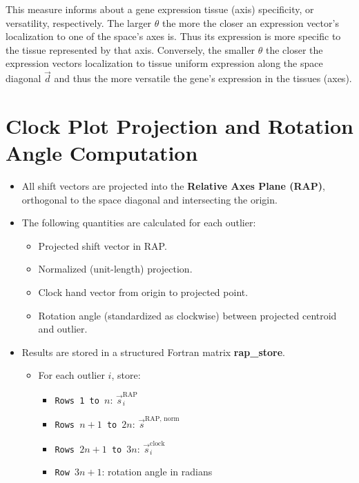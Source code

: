 \documentclass{article}
\begin{document}
This measure informs about a gene expression tissue (axis) specificity, or
versatility, respectively. The larger $\theta$ the more the closer an
expression vector's localization to one of the space's axes is. Thus its
expression is more specific to the tissue represented by that axis. Conversely,
the smaller $\theta$ the closer the expression vectors localization to tissue
uniform expression along the space diagonal $\vec{d}$ and thus the more
versatile the gene's expression in the tissues (axes).

\section{Clock Plot Projection and Rotation Angle Computation}
\label{sec:rap}
\begin{itemize}
    \item All shift vectors are projected into the \textbf{Relative Axes Plane
      (RAP)}, orthogonal to the space diagonal and intersecting the origin.
    \item The following quantities are calculated for each outlier:
    \begin{itemize}
        \item Projected shift vector in RAP.
        \item Normalized (unit-length) projection.
        \item Clock hand vector from origin to projected point.
        \item Rotation angle (standardized as clockwise) between projected centroid and outlier.
    \end{itemize}
  \item Results are stored in a structured Fortran matrix \textbf{rap\_store}.
    \begin{itemize}
        \item For each outlier \( i \), store:
        \begin{itemize}
            \item \texttt{Rows 1 to \( n \)}: \( \vec{s}_i^{\text{RAP}} \)
            \item \texttt{Rows \( n+1 \) to \( 2n \)}: \( \vec{s}^{\text{RAP, norm}} \)
            \item \texttt{Rows \( 2n+1 \) to \( 3n \)}: \( \vec{s}_i^{\text{clock}} \)
            \item \texttt{Row \( 3n+1 \)}: rotation angle in radians
        \end{itemize}
    \end{itemize}
\end{itemize}
\end{document}
